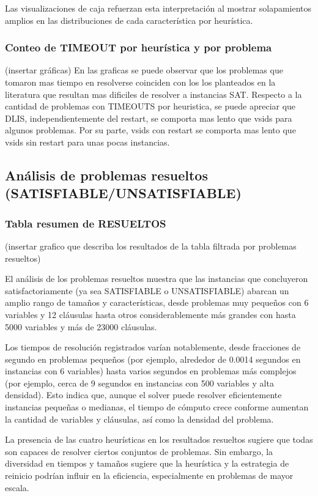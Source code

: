Las visualizaciones de caja refuerzan esta interpretación al mostrar solapamientos amplios en las distribuciones de cada característica por heurística.

\subsubsection{Conteo de TIMEOUT por heur\'istica y por problema}

(insertar gr\'aficas)
En las graficas se puede observar que los problemas que tomaron mas tiempo en resolverse coinciden con los los planteados en la literatura que resultan mas dificiles de resolver a instancias SAT. Respecto a la cantidad de problemas con TIMEOUTS por heuristica, se puede apreciar que DLIS, independientemente del restart, se comporta mas lento que vsids para algunos problemas. Por su parte, vsids con restart se comporta mas lento que vsids sin restart para unas pocas instancias.

\subsection{An\'alisis de problemas resueltos (SATISFIABLE/UNSATISFIABLE)}

\subsubsection{Tabla resumen de RESUELTOS}
(insertar grafico que describa los resultados de la tabla filtrada por problemas resueltos)

El análisis de los problemas resueltos muestra que las instancias que concluyeron satisfactoriamente (ya sea SATISFIABLE o UNSATISFIABLE) abarcan un amplio rango de tamaños y características, desde problemas muy pequeños con 6 variables y 12 cláusulas hasta otros considerablemente más grandes con hasta 5000 variables y más de 23000 cláusulas.

Los tiempos de resolución registrados varían notablemente, desde fracciones de segundo en problemas pequeños (por ejemplo, alrededor de 0.0014 segundos en instancias con 6 variables) hasta varios segundos en problemas más complejos (por ejemplo, cerca de 9 segundos en instancias con 500 variables y alta densidad). Esto indica que, aunque el solver puede resolver eficientemente instancias pequeñas o medianas, el tiempo de cómputo crece conforme aumentan la cantidad de variables y cláusulas, así como la densidad del problema.

La presencia de las cuatro heurísticas en los resultados resueltos sugiere que todas son capaces de resolver ciertos conjuntos de problemas. Sin embargo, la diversidad en tiempos y tamaños sugiere que la heurística y la estrategia de reinicio podrían influir en la eficiencia, especialmente en problemas de mayor escala.

